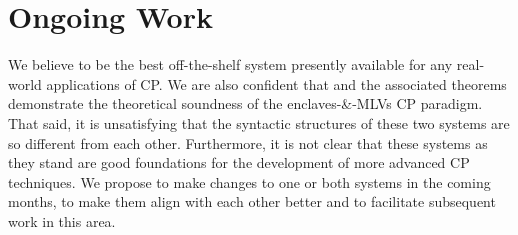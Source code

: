 \chapter{Ongoing Work}
\label{sec:future}

We believe \MultiChor to be the best off-the-shelf system presently available for any real-world applications of CP.
We are also confident that \HLSCentral and the associated theorems demonstrate the theoretical soundness of the enclaves-\&-MLVs
CP paradigm.
That said, it is unsatisfying that the syntactic structures of these two systems are so different from each other.
Furthermore, it is not clear that these systems as they stand are good foundations for the development of more advanced CP techniques.
We propose to make changes to one or both systems in the coming months,
to make them align with each other better
and to facilitate subsequent work in this area.

